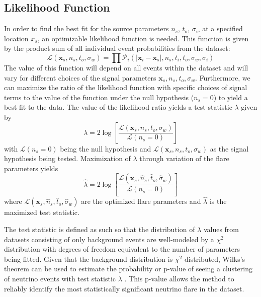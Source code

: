 \documentclass{gatech-thesis}
\begin{document}
\subsection{Likelihood Function}
In order to find the best fit for the source parameters $n_s$, $t_o$, $\sigma_w$ at a specified location \textbf{$x_s$}, an optimizable likelihood function is needed. This function is given by the product sum of all individual event probabilities from the dataset:
\begin{equation}\label{eq:LLH}
\mathcal{L}(\mathbf{x}_s,n_s,t_o,\sigma_w) = \prod \mathcal{P}_i(|\mathbf{x}_i-\mathbf{x}_s|,n_s,t_i,t_o,\sigma_w,\sigma_i)
\end{equation}
The value of this function will depend on all events within the dataset and will vary for different choices of the signal parameters $\mathbf{x}_s,n_s,t_o,\sigma_w$. Furthermore, we can maximize the ratio of the likelihood function with specific choices of signal terms to the value of the function under the null hypothesis ($n_s=0$) to yield a best fit to the data. The value of the likelihood ratio yields a test statistic $\lambda$ given by
\begin{equation}
\lambda = 2\log \left[\frac{\mathcal{L}(\mathbf{x}_s,n_s,t_o,\sigma_w)}{\mathcal{L}(n_s = 0)} \right]
\end{equation}
with $\mathcal{L}(n_s = 0)$ being the null hypothesis and $\mathcal{L}(\mathbf{x}_s,n_s,t_o,\sigma_w)$ as the signal hypothesis being tested. Maximization of $\lambda$ through variation of the flare parameters yields
\begin{equation}
\hat{\lambda} = 2\log \left[\frac{\mathcal{L}(\mathbf{x}_s,\hat{n}_s,\hat{t}_o,\hat{\sigma}_w)}{\mathcal{L}(n_s = 0)} \right]
\end{equation}
where $\mathcal{L}(\mathbf{x}_s,\hat{n}_s,\hat{t}_o,\hat{\sigma}_w)$ are the optimized flare parameters and $\hat{\lambda}$ is the maximized test statistic. 

The test statistic is defined as such so that the distribution of $\lambda$ values from datasets consisting of only background events are well-modeled by a $\chi^2$ distribution with degrees of freedom equivalent to the number of parameters being fitted. Given that the background distribution is $\chi^2$ distributed, Wilks's theorem can be used to estimate the probability or p-value of seeing a clustering of neutrino events with test statistic $\lambda$ \cite{wilks1938}. This p-value allows the method to reliably identify the most statistically significant neutrino flare in the dataset.
\end{document}
